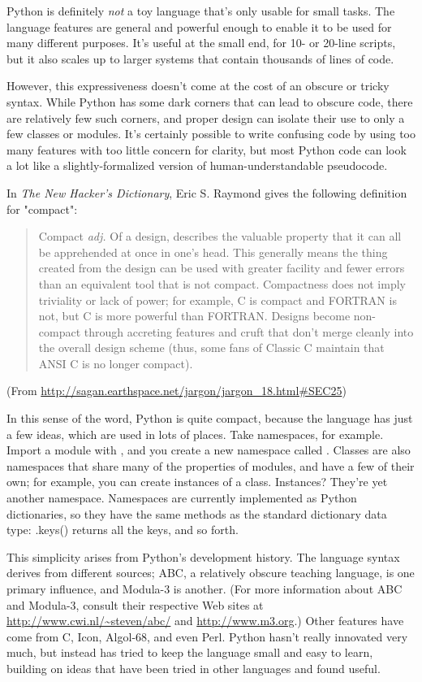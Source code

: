 \documentclass{howto}
\begin{document}
Python is definitely \emph{not} a toy language that's only usable for
small tasks.  The language features are general and powerful enough to
enable it to be used for many different purposes.  It's useful at the
small end, for 10- or 20-line scripts, but it also scales up to larger
systems that contain thousands of lines of code.

However, this expressiveness doesn't come at the cost of an obscure or
tricky syntax.  While Python has some dark corners that can lead to
obscure code, there are relatively few such corners, and proper design
can isolate their use to only a few classes or modules.  It's
certainly possible to write confusing code by using too many features
with too little concern for clarity, but most Python code can look a
lot like a slightly-formalized version of human-understandable
pseudocode.

In \emph{The New Hacker's Dictionary}, Eric S. Raymond gives the following
definition for "compact":

\begin{quotation}
	Compact \emph{adj.}  Of a design, describes the valuable property
	that it can all be apprehended at once in one's head. This
	generally means the thing created from the design can be used
	with greater facility and fewer errors than an equivalent tool
	that is not compact. Compactness does not imply triviality or
	lack of power; for example, C is compact and FORTRAN is not,
	but C is more powerful than FORTRAN. Designs become
	non-compact through accreting features and cruft that don't
	merge cleanly into the overall design scheme (thus, some fans
	of Classic C maintain that ANSI C is no longer compact).
\end{quotation}

(From \url{http://sagan.earthspace.net/jargon/jargon_18.html\#SEC25})

In this sense of the word, Python is quite compact, because the
language has just a few ideas, which are used in lots of places.  Take
namespaces, for example.  Import a module with , and
you create a new namespace called .  Classes are also
namespaces that share many of the properties of modules, and have a
few of their own; for example, you can create instances of a class.
Instances?  They're yet another namespace.  Namespaces are currently
implemented as Python dictionaries, so they have the same methods as
the standard dictionary data type: .keys() returns all the keys, and
so forth.

This simplicity arises from Python's development history.  The
language syntax derives from different sources; ABC, a relatively
obscure teaching language, is one primary influence, and Modula-3 is
another.  (For more information about ABC and Modula-3, consult their
respective Web sites at \url{http://www.cwi.nl/~steven/abc/} and
\url{http://www.m3.org}.)  Other features have come from C, Icon,
Algol-68, and even Perl.  Python hasn't really innovated very much,
but instead has tried to keep the language small and easy to learn,
building on ideas that have been tried in other languages and found
useful.
\end{document}
